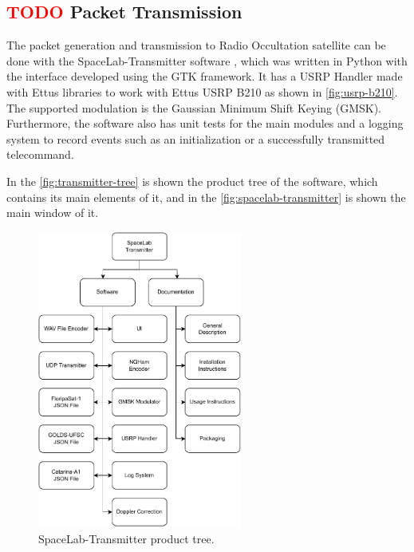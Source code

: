 \subsection{ \textcolor{red}{TODO} Packet Transmission}

The packet generation and transmission to Radio Occultation satellite can be done with the SpaceLab-Transmitter software \cite{spacelab-transmitter}, which was written in Python with the interface developed using the GTK framework. It has a USRP Handler made with Ettus libraries to work with Ettus USRP B210 as shown in \autoref{fig:usrp-b210}. The supported modulation is the Gaussian Minimum Shift Keying (GMSK). Furthermore, the software also has unit tests for the main modules and a logging system to record events such as an initialization or a successfully transmitted telecommand.

In the \autoref{fig:transmitter-tree} is shown the product tree of the software, which contains its main elements of it, and in the \autoref{fig:spacelab-transmitter} is shown the main window of it.

\begin{figure}[!ht]
    \begin{center}
        \includegraphics[width=0.6\textwidth]{figures/transmitter_tree.pdf}
        \caption{SpaceLab-Transmitter product tree.}
        \label{fig:transmitter-tree}
    \end{center}
\end{figure}

